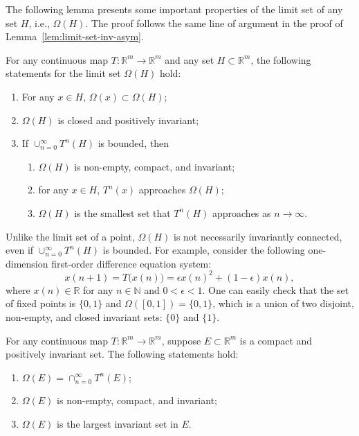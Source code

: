 \documentclass[10pt]{svmult}
\begin{document}
The following lemma presents some important properties of the limit set of any set $H$, i.e., $\Omega(H)$. The proof follows the same line of argument in the proof of Lemma~\ref{lem:limit-set-inv-asym}.
\begin{lemma}\label{lem:limit-set-H-inv-asym}
For any continuous map $T:\mathbb{R}^m \to \mathbb{R}^m$ and any set $H\subset \mathbb{R}^m$, the following statements for the limit set $\Omega(H)$ hold:
\begin{enumerate}[label=\arabic*)]
\item For any $x\in H$, $\Omega(x)\subset \Omega(H)$;
\item $\Omega(H)$ is closed and positively invariant;
\item If $\cup_{n=0}^{\infty} T^n(H)$ is bounded, then
   \smallskip
   \begin{enumerate}[label=\alph*)]
   \item $\Omega(H)$ is non-empty, compact, and invariant;
   \item for any $x\in H$, $T^n(x)$ approaches $\Omega(H)$;
   \item $\Omega(H)$ is the smallest set that $T^n(H)$ approaches as $n\to \infty$.   
   \end{enumerate}
\end{enumerate}
\end{lemma}

\begin{remark}
Unlike the limit set of a point, $\Omega(H)$ is not necessarily invariantly connected, even if $\cup_{n=0}^{\infty} T^n(H)$ is bounded. For example, consider the following one-dimension first-order difference equation system:
\begin{equation*}
x(n+1) = T\big( x(n) \big) = \epsilon x(n)^2 + (1-\epsilon)x(n),
\end{equation*} 
where $x(n)\in \mathbb{R}$ for any $n\in \mathbb{N}$ and $0<\epsilon<1$. One can easily check that the set of fixed points is $\{0,1\}$ and $\Omega([0,1])=\{0,1\}$, which is a union of two disjoint, non-empty, and closed invariant sets: $\{0\}$ and $\{1\}$.
\end{remark}

\begin{lemma}\label{lem:limit-set-compact-pos-inv-K}
For any continuous map $T:\mathbb{R}^m\to \mathbb{R}^m$, suppose $E\subset \mathbb{R}^m$ is a compact and positively invariant set. The following statements hold:
\begin{enumerate}[label=\arabic*)]
\item $\Omega(E)=\cap_{n=0}^{\infty} T^n(E)$;
\item $\Omega(E)$ is non-empty, compact, and invariant;
\item $\Omega(E)$ is the largest invariant set in $E$. 
\end{enumerate}  
\end{lemma}
\end{document}

